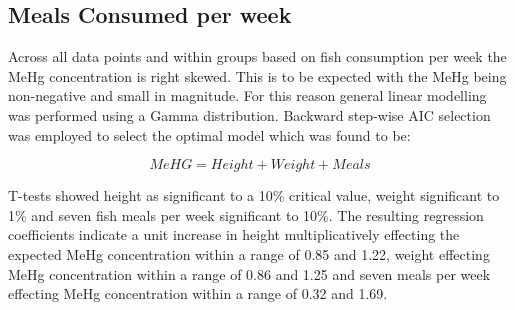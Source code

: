 \documentclass[twocolumn, 12pt]{report}
\begin{document}
\subsection{Meals Consumed per week}

Across all data points and within groups based on fish consumption per week the MeHg concentration is right skewed. This is to be expected with the MeHg being non-negative and small in magnitude. For this reason general linear modelling was performed using a Gamma distribution. Backward step-wise AIC selection was employed to select the optimal model which was found to be:

\[MeHG = Height + Weight + Meals\]

T-tests showed height as significant to a 10\% critical value, weight significant to 1\% and seven fish meals per week significant to 10\%. The resulting regression coefficients indicate a unit increase in height multiplicatively effecting the expected MeHg concentration within a range of 0.85 and 1.22, weight effecting MeHg concentration within a range of 0.86 and 1.25 and seven meals per week effecting MeHg concentration within a range of 0.32 and 1.69.
\end{document}
